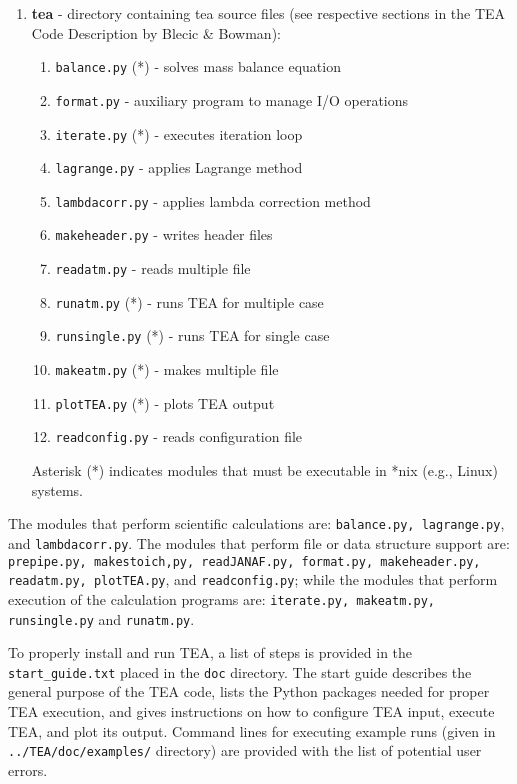 {\begin{enumerate}
Asterisk (*) indicates modules that must be executable in *nix (e.g.,
Linux) systems.

\item {\bf tea } - directory containing tea source files (see  
respective sections in the TEA Code Description by Blecic \& Bowman):
\begin{enumerate}
\setlength\itemsep{0ex}
\setlength\topsep{0ex}
\setlength\partopsep{0ex}
\setlength\parsep{0ex}
\item \texttt{balance.py} (*) - solves mass balance equation
\item \texttt{format.py} - auxiliary program to manage I/O operations
\item \texttt{iterate.py} (*) - executes iteration loop 
\item \texttt{lagrange.py} - applies Lagrange method
\item \texttt{lambdacorr.py} - applies lambda correction method
\item \texttt{makeheader.py} - writes header files
\item \texttt{readatm.py} - reads multiple  file
\item \texttt{runatm.py} (*) - runs TEA for multiple  case
\item \texttt{runsingle.py} (*) - runs TEA for single  case
\item \texttt{makeatm.py} (*) - makes multiple  file
\item \texttt{plotTEA.py} (*) - plots TEA output
\item \texttt{readconfig.py} - reads configuration file
\end{enumerate}

Asterisk (*) indicates modules that must be executable in *nix (e.g.,
Linux) systems.

\end{enumerate}

The modules that perform scientific calculations are:
\texttt{balance.py, lagrange.py}, and \texttt{lambdacorr.py}. The
modules that perform file or data structure support are:
\texttt{prepipe.py, makestoich,py, readJANAF.py, format.py,
  makeheader.py, readatm.py, plotTEA.py}, and \texttt{readconfig.py};
while the modules that perform execution of the calculation programs
are: \texttt{iterate.py, makeatm.py, runsingle.py} and
\texttt{runatm.py}.

To properly install and run TEA, a list of steps is provided in the
\texttt{start\_guide.txt} placed in the \texttt{doc} directory. The start
guide describes the general purpose of the TEA code, lists the Python
packages needed for proper TEA execution, and gives instructions on
how to configure TEA input, execute TEA, and plot its output. Command
lines for executing example runs (given
in \texttt{../TEA/doc/examples/} directory) are provided with the list
of potential user errors.

}
